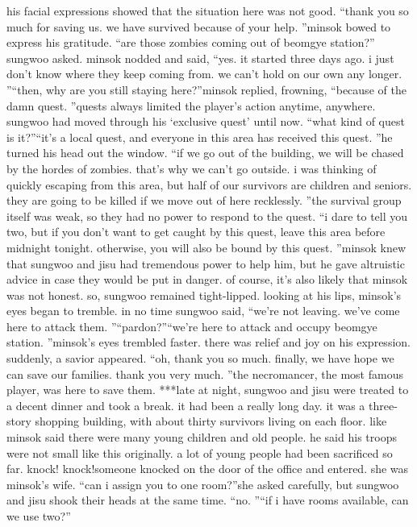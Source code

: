 his facial expressions showed that the situation here was not good.
“thank you so much for saving us.
 we have survived because of your help.
”minsok bowed to express his gratitude.
“are those zombies coming out of beomgye station?” sungwoo asked.
minsok nodded and said, “yes.
 it started three days ago.
 i just don’t know where they keep coming from.
 we can’t hold on our own any longer.
”“then, why are you still staying here?”minsok replied, frowning, “because of the damn quest.
”quests always limited the player’s action anytime, anywhere.
 sungwoo had moved through his ‘exclusive quest’ until now.
“what kind of quest is it?”“it’s a local quest, and everyone in this area has received this quest.
”he turned his head out the window.
“if we go out of the building, we will be chased by the hordes of zombies.
 that’s why we can’t go outside.
 i was thinking of quickly escaping from this area, but half of our survivors are children and seniors.
 they are going to be killed if we move out of here recklessly.
”the survival group itself was weak, so they had no power to respond to the quest.
“i dare to tell you two, but if you don’t want to get caught by this quest, leave this area before midnight tonight.
 otherwise, you will also be bound by this quest.
”minsok knew that sungwoo and jisu had tremendous power to help him, but he gave altruistic advice in case they would be put in danger.
of course, it’s also likely that minsok was not honest.
 so, sungwoo remained tight-lipped.
 looking at his lips, minsok’s eyes began to tremble.
in no time sungwoo said, “we’re not leaving.
 we’ve come here to attack them.
”“pardon?”“we’re here to attack and occupy beomgye station.
”minsok’s eyes trembled faster.
 there was relief and joy on his expression.
suddenly, a savior appeared.
“oh, thank you so much.
 finally, we have hope we can save our families.
 thank you very much.
”the necromancer, the most famous player, was here to save them.
***late at night, sungwoo and jisu were treated to a decent dinner and took a break.
 it had been a really long day.
it was a three-story shopping building, with about thirty survivors living on each floor.
 like minsok said there were many young children and old people.
he said his troops were not small like this originally.
 a lot of young people had been sacrificed so far.
knock! knock!someone knocked on the door of the office and entered.
 she was minsok’s wife.
“can i assign you to one room?”she asked carefully, but sungwoo and jisu shook their heads at the same time.
“no.
”“if i have rooms available, can we use two?”

